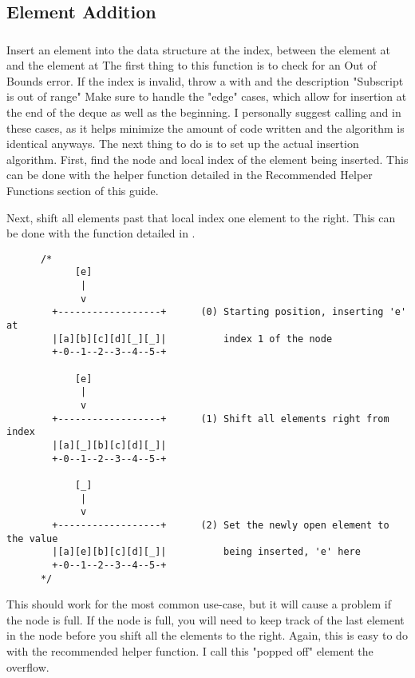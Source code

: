 \subsection{Element Addition}


\subsubsection{}
\label{func:insert}

\indent Insert an element into the data structure at the index, between the element
at \cpp{[index - 1]} and the element at \cpp{[index]}
The first thing to this function is to check for an Out of Bounds error. If
the index is invalid, throw a  with  and the
description "Subscript is out of range"
Make sure to handle the "edge" cases, which allow for insertion at the end
of the deque as well as the beginning. I personally suggest calling
 and  in these cases, as it helps minimize the amount
of code written and the algorithm is identical anyways.
\indent The next thing to do is to set up the actual insertion algorithm.
First, find the node and local index of the element being inserted. This
can be done with the  helper function detailed in the
Recommended Helper Functions section of this guide.

Next, shift all elements past that local index one element to the right.
This can be done with the  function detailed in .

\begin{verbatim}
      /*
            [e]
             |
             v
        +------------------+      (0) Starting position, inserting 'e' at
        |[a][b][c][d][_][_]|          index 1 of the node
        +-0--1--2--3--4--5-+

            [e]
             |
             v
        +------------------+      (1) Shift all elements right from index
        |[a][_][b][c][d][_]|
        +-0--1--2--3--4--5-+

            [_]
             |
             v
        +------------------+      (2) Set the newly open element to the value
        |[a][e][b][c][d][_]|          being inserted, 'e' here
        +-0--1--2--3--4--5-+
      */
\end{verbatim}


\pagebreak

\indent This should work for the most common use-case, but it will cause a
problem if the node is full.
If the node is full, you will need to keep track of the last element in
the node before you shift all the elements to the right. Again, this is
easy to do with the recommended helper function.
I call this "popped off" element the overflow.

